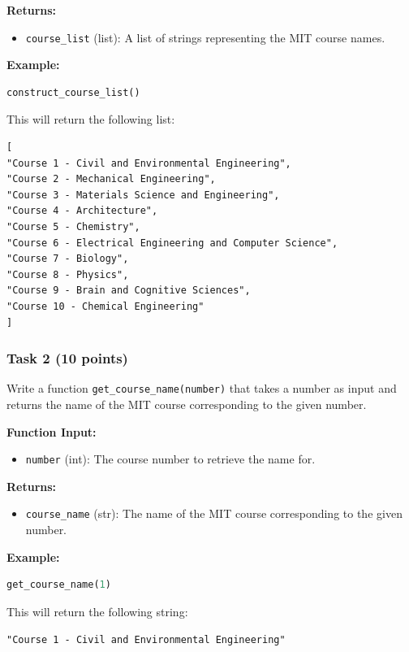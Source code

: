 \documentclass[12pt]{book}
\begin{document}
\textbf{Returns:}
\begin{itemize}
\item \texttt{course\_list} (list): A list of strings representing the MIT course names.
\end{itemize}

\textbf{Example:}
\begin{lstlisting}[language=Python]
construct_course_list()
\end{lstlisting}
This will return the following list:
\begin{verbatim}
[
"Course 1 - Civil and Environmental Engineering",
"Course 2 - Mechanical Engineering",
"Course 3 - Materials Science and Engineering",
"Course 4 - Architecture",
"Course 5 - Chemistry",
"Course 6 - Electrical Engineering and Computer Science",
"Course 7 - Biology",
"Course 8 - Physics",
"Course 9 - Brain and Cognitive Sciences",
"Course 10 - Chemical Engineering"
]
\end{verbatim}

\subsubsection{Task 2 (10 points)}
Write a function \texttt{get\_course\_name(number)} that takes a number as input and returns the name of the MIT course corresponding to the given number.

\textbf{Function Input:}
\begin{itemize}
\item \texttt{number} (int): The course number to retrieve the name for.
\end{itemize}

\textbf{Returns:}
\begin{itemize}
\item \texttt{course\_name} (str): The name of the MIT course corresponding to the given number.
\end{itemize}

\textbf{Example:}
\begin{lstlisting}[language=Python]
get_course_name(1)
\end{lstlisting}
This will return the following string:
\begin{verbatim}
"Course 1 - Civil and Environmental Engineering"
\end{verbatim}
\end{document}
